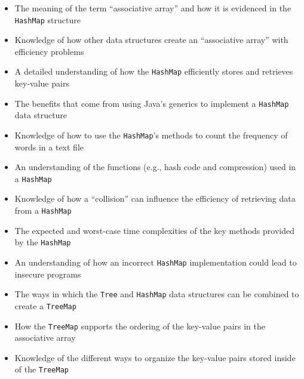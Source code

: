 \documentclass[11pt]{article}
\newcommand{\program}[1]{\lstinline{#1}}
\begin{document}
\begin{itemize}

  \item The meaning of the term ``associative array'' and how it is evidenced in
    the \program{HashMap} structure

  \item Knowledge of how other data structures create an ``associative array''
    with efficiency problems

  \item A detailed understanding of how the \program{HashMap} efficiently stores and
    retrieves key-value pairs

  \item The benefits that come from using Java's generics to implement
    a \program{HashMap} data structure

  \item Knowledge of how to use the \program{HashMap}'s methods to count the
    frequency of words in a text file

  \item An understanding of the functions (e.g., hash code and compression) used
    in a \program{HashMap}

  \item Knowledge of how a ``collision'' can influence the efficiency of
    retrieving data from a \program{HashMap}

  \item The expected and worst-case time complexities of the key methods
    provided by the \program{HashMap}

  \item An understanding of how an incorrect \program{HashMap} implementation
    could lead to insecure programs

  \item The ways in which the \program{Tree} and \program{HashMap} data
    structures can be combined to create a \program{TreeMap}

  \item How the \program{TreeMap} supports the ordering of the key-value pairs
    in the associative array

  \item Knowledge of the different ways to organize the key-value pairs stored
    inside of the \program{TreeMap}

\end{itemize}
\end{document}
